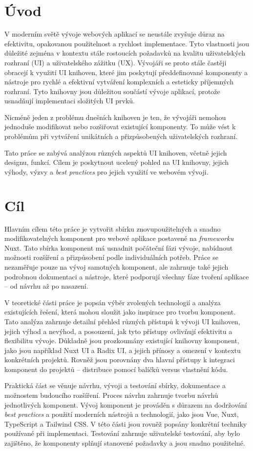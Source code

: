 
\chapter{Úvod}
V moderním světě vývoje webových aplikací se neustále zvyšuje důraz na efektivitu, opakovanou použitelnost a rychlost implementace. Tyto vlastnosti jsou důležité zejména v kontextu stále rostoucích požadavků na kvalitu uživatelských rozhraní (UI) a uživatelského zážitku (UX). Vývojáři se proto stále častěji obracejí k využití UI knihoven, které jim poskytují předdefinované komponenty a nástroje pro rychlé a efektivní vytváření komplexních a esteticky příjemných rozhraní. Tyto knihovny jsou důležitou součástí vývoje aplikací, protože usnadňují implementaci složitých UI prvků.

Nicméně jeden z problému dnešních knihoven je ten, že vývojáři nemohou jednoduše modifikovat nebo rozšiřovat existující komponenty. To může vést k problémům při vytváření unikátních a přizpůsobených uživatelských rozhraní.

Tato práce se zabývá analýzou různých aspektů UI knihoven, včetně jejich designu, funkcí. Cílem je poskytnout ucelený pohled na UI knihovny, jejich výhody, výzvy a \emph{best practices} pro jejich využití ve webovém vývoji.


\chapter{Cíl}
Hlavním cílem této práce je vytvořit sbírku znovupoužitelných a snadno modifikovatelných komponent pro webové aplikace postavené na \emph{frameworku} Nuxt. Tato sbírka komponent má usnadnit počáteční fázi vývoje, nabídnout možnosti rozšíření a přizpůsobení podle individuálních potřeb. Práce se nezaměřuje pouze na vývoj samotných komponent, ale zahrnuje také jejich podrobnou dokumentaci a nástroje, které podporují všechny fáze tvoření aplikace – od návrhu až po nasazení.

V teoretické části práce je popsán výběr zvolených technologií a analýza existujících řešení, která mohou sloužit jako inspirace pro tvorbu komponent. Tato analýza zahrnuje detailní přehled různých přístupů k vývoji UI knihoven, jejich výhod a nevýhod, a posouzení, jak tyto přístupy ovlivňují efektivitu a flexibilitu vývoje. Důkladně jsou prozkoumány existující knihovny komponent, jako jsou například Nuxt UI a Radix UI, a jejich přínosy a omezení v kontextu konkrétních projektů. Rovněž jsou porovnány dva hlavní přístupy k integraci komponent do projektů – distribuce pomocí balíčků versus vlastnění kódu.

Praktická část se věnuje návrhu, vývoji a testování sbírky, dokumentace a možnostem budoucího rozšíření. Proces návrhu zahrnuje tvorbu návrhů jednotlivých komponent. Vývoj komponent je prováděn s důrazem na dodržování \emph{best practices} a použití moderních nástrojů a technologií, jako jsou Vue, Nuxt, TypeScript a Tailwind CSS. V této části jsou rovněž popsány konkrétní techniky používané při implementaci. Testování zahrnuje uživatelské testování, aby bylo zajištěno, že komponenty splňují stanovené požadavky a jsou snadno použitelné.
